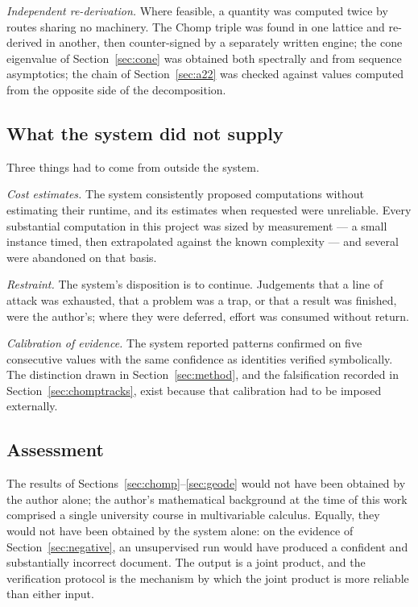 \documentclass[11pt]{article}
\theoremstyle{definition}
\begin{document}
\emph{Independent re-derivation.} Where feasible, a quantity was computed twice
by routes sharing no machinery. The Chomp triple was found in one lattice and
re-derived in another, then counter-signed by a separately written engine; the
cone eigenvalue of Section~\ref{sec:cone} was obtained both spectrally and from
sequence asymptotics; the chain of Section~\ref{sec:a22} was checked against
values computed from the opposite side of the decomposition.

\subsection{What the system did not supply}

Three things had to come from outside the system.

\emph{Cost estimates.} The system consistently proposed computations without
estimating their runtime, and its estimates when requested were unreliable.
Every substantial computation in this project was sized by measurement --- a
small instance timed, then extrapolated against the known complexity --- and
several were abandoned on that basis.

\emph{Restraint.} The system's disposition is to continue. Judgements that a
line of attack was exhausted, that a problem was a trap, or that a result was
finished, were the author's; where they were deferred, effort was consumed
without return.

\emph{Calibration of evidence.} The system reported patterns confirmed on five
consecutive values with the same confidence as identities verified
symbolically. The distinction drawn in Section~\ref{sec:method}, and the
falsification recorded in Section~\ref{sec:chomptracks}, exist because that
calibration had to be imposed externally.

\subsection{Assessment}

The results of Sections~\ref{sec:chomp}--\ref{sec:geode} would not have been
obtained by the author alone; the author's mathematical background at the time
of this work comprised a single university course in multivariable calculus.
Equally, they would not have been obtained by the system alone: on the evidence
of Section~\ref{sec:negative}, an unsupervised run would have produced a
confident and substantially incorrect document. The output is a joint product,
and the verification protocol is the mechanism by which the joint product is
more reliable than either input.
\end{document}
